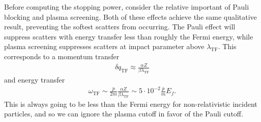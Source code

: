 \documentclass[twocolumn, preprintnumbers,amsmath,amssymb,prd, superscriptaddress]{revtex4}
\begin{document}
\begin{appendices}
Before computing the stopping power, consider the relative important of Pauli blocking and plasma screening.
Both of these effects achieve the same qualitative result, preventing the softest scatters from occurring.
The Pauli effect will suppress scatters with energy transfer less than roughly the Fermi energy, while plasma screening suppresses scatters at impact parameter above $\lambda_\text{TF}$.
This corresponds to a momentum transfer
\begin{align}
      \delta q_\text{TF} \approx \frac{\alpha Z}{\beta \lambda_\text{TF}}
\end{align}
and energy transfer
\begin{align}
  \label{eq:cuttoff_compare}
  \omega_\text{TF} \sim \frac{p}{2m} \frac{\alpha Z}{\beta \lambda_\text{TF}}
         \sim 5 \cdot 10^{-2} \frac{p}{m} E_f.
\end{align}
This is always going to be less than the Fermi energy for non-relativistic incident particles, and so we can ignore the plasma cutoff in favor of the Pauli cutoff.


\end{appendices}
\end{document}
